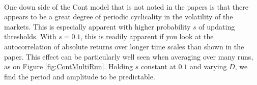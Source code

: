 \documentclass[runningheads]{llncs}
\begin{document}
\paragraph*{}
One down side of the Cont model that is not noted in the papers is that there appears to be a great degree of periodic cyclicality in the volatility of the markets. This is especially apparent with higher probability $s$ of updating thresholds. With $s=0.1$, this is readily apparent if you look at the autocorrelation of absolute returns over longer time scales than shown in the paper. This effect can be particularly well seen when averaging over many runs, as on Figure \ref{fig:ContMultiRun}. Holding $s$ constant at $0.1$ and varying $D$, we find the period and amplitude to be predictable.

\begin{figure}[htbp]
  \begin{center}
   \mbox{
    \quad
{}
}
\end{center}
\end{figure}
\end{document}
